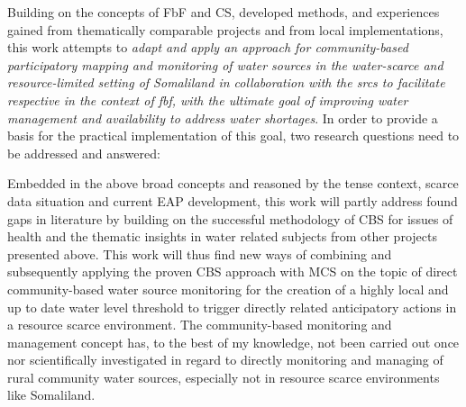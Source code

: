 Building on the concepts of FbF and CS, developed methods, and experiences gained from thematically comparable projects and from local implementations, this work attempts to \textit{adapt and apply an approach for community-based participatory mapping and monitoring of water sources in the water-scarce and resource-limited setting of Somaliland in collaboration with the \acrshort{srcs} to facilitate respective  in the context of \acrlong{fbf}, with the ultimate goal of improving water management and availability to address water shortages}. In order to provide a basis for the practical implementation of this goal, two research questions need to be addressed and answered:

Embedded in the above broad concepts and reasoned by the tense context, scarce data situation and current EAP development, this work will partly address found gaps in literature by building on the successful methodology of CBS for issues of health and the thematic insights in water related subjects from other projects presented above. This work will thus find new ways of combining and subsequently applying the proven CBS approach with MCS on the topic of direct community-based water source monitoring for the creation of a highly local and up to date water level threshold to trigger directly related anticipatory actions in a resource scarce environment.\newline
The community-based monitoring and management concept has, to the best of my knowledge, not been carried out once nor scientifically investigated in regard to directly monitoring and managing of rural community water sources, especially not in resource scarce environments like Somaliland.



